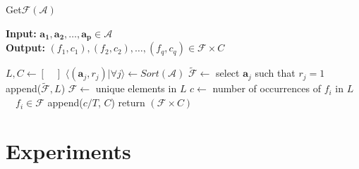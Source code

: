 \documentclass[conference]{IEEEtran}
\newcommand{\p}[1]{{\color{blue} Pdj: #1}}
\begin{document}
\begin{algorithm}
	\caption{ Get$\mathcal{F}$$(\mathcal{A})$ }
	\label{alg:f}
	\hspace*{\algorithmicindent} \textbf{Input: } $ \mathbf{a_1},\mathbf{a_2} ,\dots, \mathbf{a_p}\in \mathcal{A}$ \\
	\hspace*{\algorithmicindent} \textbf{Output: } $ (f_1,c_1), (f_2, c_2), \dots, (f_q,c_q) \in \mathcal{F} \times C  $
	\begin{algorithmic}[1] 
		\State $L, C \leftarrow [ \quad ]$ 
		\State $\langle (\mathbf{a}_j, r_j) | \forall j \rangle  \leftarrow Sort(\mathcal{A})$ 
		\State $\tilde{\mathcal{F}} \leftarrow$ select $\mathbf{a}_j$ such that $r_j = 1$
		\State append($\tilde{\mathcal{F}}, L $)
		\EndFor
		\State $\mathcal{F} \leftarrow $ unique elements in $L$ 
		\State $c \leftarrow$ number of occurrences of $f_i$ in $L$ $\quad f_i \in \mathcal{F}$
		\State append($c/T$, $C$)
		\EndFor
		\State return $(\mathcal{F} \times C)$
              \end{algorithmic}
\end{algorithm}

\section{Experiments}
\label{sec:exp}
\end{document}
